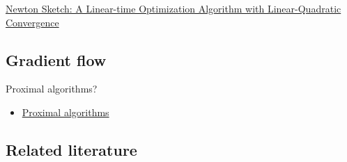 \documentclass[10pt]{article}
\begin{document}
\begin{itemize}
\href{https://stanford.edu/~pilanci/papers/PilWai17.pdf}{Newton Sketch: A Linear-time Optimization Algorithm with Linear-Quadratic Convergence}

\end{itemize}


\subsection{Gradient flow}

Proximal algorithms?
\begin{itemize}
\item
\href{https://web.stanford.edu/~boyd/papers/pdf/prox_algs.pdf}{Proximal algorithms}
\end{itemize}


\subsection{Related literature}
\end{document}
